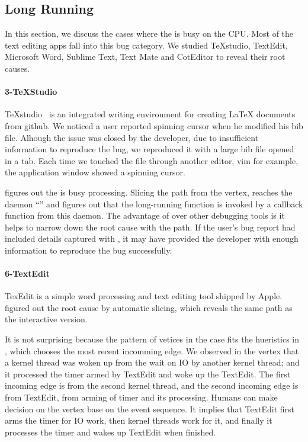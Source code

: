 \subsection{Long Running}

In this section, we discuss the cases where the \spinningnode is busy on the
CPU. Most of the text editing apps fall into this bug category. We studied
TeXstudio, TextEdit, Microsoft Word, Sublime Text, Text Mate and CotEditor to
reveal their root causes.


\paragraph{3-TeXStudio}

TeXstudio~\cite{texstudio} is an integrated writing environment for creating
LaTeX documents from github. We noticed a user reported spinning cursor when he
modified his bib file. Alhough the issue was closed by the developer, due to
insufficient information to reproduce the bug, we reproduced it with a large bib
file opened in a tab. Each time we touched the file through another editor, vim
for example, the application window showed a spinning cursor.

\xxx figures out the \spinningnode is busy processing. Slicing the path from
the vertex, \xxx reaches the daemon ``'' and figures out that the
long-running function is invoked by a callback function from this daemon. The
advantage of \xxx over other debugging tools is it helps to narrow down the root
cause with the path. If the user's bug report had included details captured with
\xxx, it may have provided the developer with enough information to reproduce
the bug successfully.

\paragraph{6-TextEdit}

TexEdit is a simple word processing and text editing tool shipped by Apple. \xxx
figured out the root cause by automatic slicing, which reveals the same path as
the interactive version.

It is not surprising because the pattern of vetices in the case fits the
hueristics in \xxx, which chooses the most recent incomming edge. We observed
in the vertex that a kernel thread was woken up from the wait on IO by another
kernel thread; and it processed the timer armed by TextEdit and woke up the
TextEdit. The first incoming edge is from the second kernel thread, and the
second incoming edge is from TextEdit, from arming of timer and its processing.
Humans can make decision on the vertex base on the event sequence. It implies
that TextEdit first arms the timer for IO work, then kernel threads work for it,
and finally it processes the timer and wakes up TextEdit when finished.

